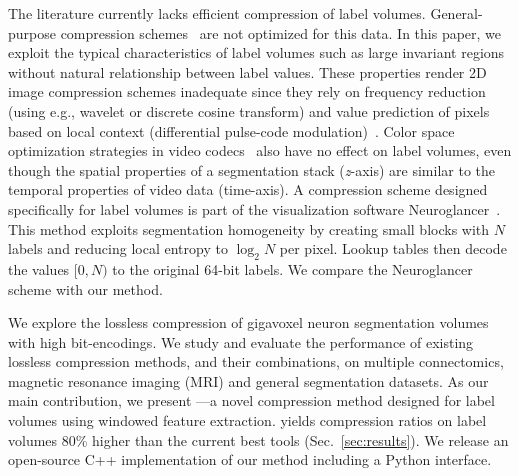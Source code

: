 The literature currently lacks efficient compression of label volumes. 
General-purpose compression schemes~\cite{collet2016smaller,deutsch1996zlib,google2016brotli,lehmann2016liblzf,oberhumer2005lzo,pavlov2007lzma,seward1998bzip2,vandevenne2016zopfli,welch1984technique,ziv1978compression} are not optimized for this data.
In this paper, we exploit the typical characteristics of label volumes such as large invariant regions without natural relationship between label values. 
These properties render 2D image compression schemes inadequate since they rely on frequency reduction (using e.g., wavelet or discrete cosine transform) and value prediction of pixels based on local context (differential pulse-code modulation)~\cite{roelofs1999png,skodras2001jpeg}. 
Color space optimization strategies in video codecs~\cite{aimar2005x264} also have no effect on label volumes, even though the spatial properties of a segmentation stack (\textit{z}-axis) are similar to the temporal properties of video data (time-axis). 
A compression scheme designed specifically for label volumes is part of the visualization software Neuroglancer~\cite{google2016compressed}. 
This method exploits segmentation homogeneity by creating small blocks with $N$ labels and reducing local entropy to $\log_2{N}$ per pixel. 
Lookup tables then decode the values $[0,N)$ to the original 64-bit labels. We compare the Neuroglancer scheme with our method.
%
%
%
%
%

We explore the lossless compression of gigavoxel neuron segmentation volumes with high bit-encodings. 
We study and evaluate the performance of existing lossless compression methods, and their combinations, on multiple connectomics, magnetic resonance imaging (MRI) and general segmentation datasets.
As our main contribution, we present \appName---a novel compression method designed for label volumes using windowed feature extraction. 
\appName yields compression ratios on label volumes 80\% higher than the current best tools (Sec.~\ref{sec:results}).
We release an open-source C++ implementation of our method including a Python interface.
